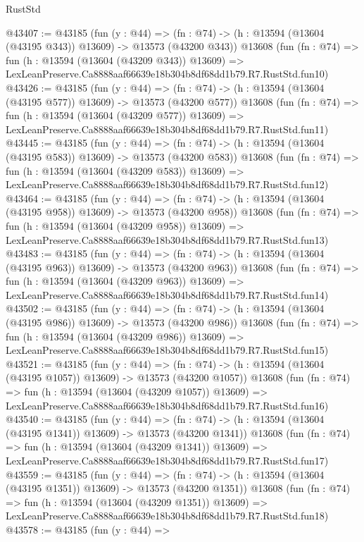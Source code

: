 \begin{lexlean}{RustStd}
\begin{coremodule}
@43407 := @43185
    (fun (y : @44) =>
    (fn : @74) -> (h : @13594 (@13604 (@43195 @343)) @13609) -> @13573 (@43200 @343))
    @13608
    (fun (fn : @74) =>
    fun (h : @13594 (@13604 (@43209 @343)) @13609) =>
    LexLeanPreserve.Ca8888aaf66639e18b304b8df68dd1b79.R7.RustStd.fun10)
@43426 := @43185
    (fun (y : @44) =>
    (fn : @74) -> (h : @13594 (@13604 (@43195 @577)) @13609) -> @13573 (@43200 @577))
    @13608
    (fun (fn : @74) =>
    fun (h : @13594 (@13604 (@43209 @577)) @13609) =>
    LexLeanPreserve.Ca8888aaf66639e18b304b8df68dd1b79.R7.RustStd.fun11)
@43445 := @43185
    (fun (y : @44) =>
    (fn : @74) -> (h : @13594 (@13604 (@43195 @583)) @13609) -> @13573 (@43200 @583))
    @13608
    (fun (fn : @74) =>
    fun (h : @13594 (@13604 (@43209 @583)) @13609) =>
    LexLeanPreserve.Ca8888aaf66639e18b304b8df68dd1b79.R7.RustStd.fun12)
@43464 := @43185
    (fun (y : @44) =>
    (fn : @74) -> (h : @13594 (@13604 (@43195 @958)) @13609) -> @13573 (@43200 @958))
    @13608
    (fun (fn : @74) =>
    fun (h : @13594 (@13604 (@43209 @958)) @13609) =>
    LexLeanPreserve.Ca8888aaf66639e18b304b8df68dd1b79.R7.RustStd.fun13)
@43483 := @43185
    (fun (y : @44) =>
    (fn : @74) -> (h : @13594 (@13604 (@43195 @963)) @13609) -> @13573 (@43200 @963))
    @13608
    (fun (fn : @74) =>
    fun (h : @13594 (@13604 (@43209 @963)) @13609) =>
    LexLeanPreserve.Ca8888aaf66639e18b304b8df68dd1b79.R7.RustStd.fun14)
@43502 := @43185
    (fun (y : @44) =>
    (fn : @74) -> (h : @13594 (@13604 (@43195 @986)) @13609) -> @13573 (@43200 @986))
    @13608
    (fun (fn : @74) =>
    fun (h : @13594 (@13604 (@43209 @986)) @13609) =>
    LexLeanPreserve.Ca8888aaf66639e18b304b8df68dd1b79.R7.RustStd.fun15)
@43521 := @43185
    (fun (y : @44) =>
    (fn : @74) -> (h : @13594 (@13604 (@43195 @1057)) @13609) -> @13573 (@43200 @1057))
    @13608
    (fun (fn : @74) =>
    fun (h : @13594 (@13604 (@43209 @1057)) @13609) =>
    LexLeanPreserve.Ca8888aaf66639e18b304b8df68dd1b79.R7.RustStd.fun16)
@43540 := @43185
    (fun (y : @44) =>
    (fn : @74) -> (h : @13594 (@13604 (@43195 @1341)) @13609) -> @13573 (@43200 @1341))
    @13608
    (fun (fn : @74) =>
    fun (h : @13594 (@13604 (@43209 @1341)) @13609) =>
    LexLeanPreserve.Ca8888aaf66639e18b304b8df68dd1b79.R7.RustStd.fun17)
@43559 := @43185
    (fun (y : @44) =>
    (fn : @74) -> (h : @13594 (@13604 (@43195 @1351)) @13609) -> @13573 (@43200 @1351))
    @13608
    (fun (fn : @74) =>
    fun (h : @13594 (@13604 (@43209 @1351)) @13609) =>
    LexLeanPreserve.Ca8888aaf66639e18b304b8df68dd1b79.R7.RustStd.fun18)
@43578 := @43185
    (fun (y : @44) =>

\end{coremodule}
\end{lexlean}
